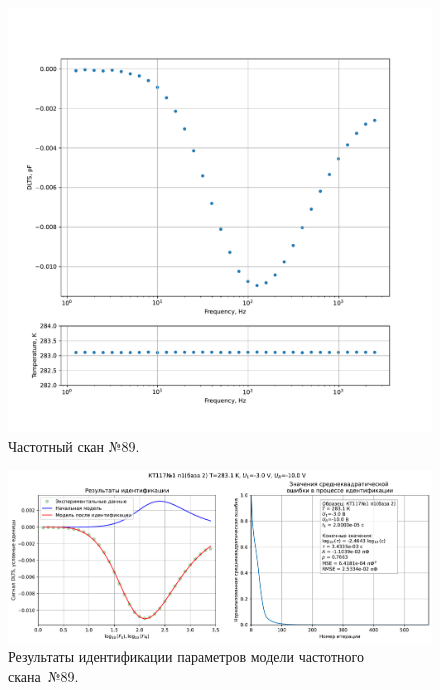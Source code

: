 \begin{figure}[!ht]
    \centering
    \includegraphics[width=1\textwidth]{../plots/КТ117№1_п1(база 2)_2500Гц-1Гц_1пФ_+10С_-3В-10В_200мВ_20мкс_шаг_0,1.pdf}
    \caption{Частотный скан №89.}
    \label{pic:frequency_scan_89}
\end{figure}

\begin{figure}[!ht]
    \centering
    \includegraphics[width=1\textwidth]{../plots/КТ117№1_п1(база 2)_2500Гц-1Гц_1пФ_+10С_-3В-10В_200мВ_20мкс_шаг_0,1_model.pdf}
    \caption{Результаты идентификации параметров модели частотного скана~№89.}
    \label{pic:frequency_scan_model89}
\end{figure}

\pagebreak



